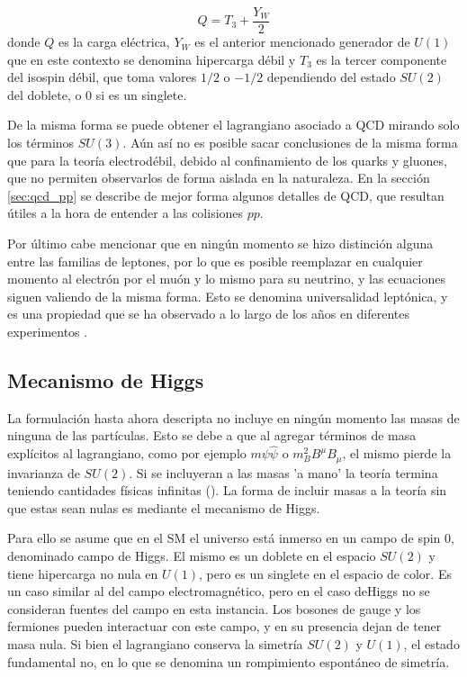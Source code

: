 \begin{equation}
Q = T_3 + \frac{Y_W}{2} 
\end{equation}
%
donde $Q$ es la carga eléctrica, $Y_W$ es el anterior mencionado generador de $U(1)$ que en este contexto se denomina hipercarga débil y $T_3$ es la tercer componente del isospin débil, que toma valores $1/2$ o $-1/2$ dependiendo del estado $SU(2)$ del doblete, o $0$ si es un singlete.

De la misma forma se puede obtener el lagrangiano asociado a QCD mirando solo los términos $SU(3)$. Aún así no es posible sacar conclusiones de la misma forma que para la teoría electrodébil, debido al confinamiento de los quarks y gluones, que no permiten observarlos de forma aislada en la naturaleza. En la sección \ref{sec:qcd_pp} se describe de mejor forma algunos detalles de QCD, que resultan útiles a la hora de entender a las colisiones $pp$.

Por último cabe mencionar que en ningún momento se hizo distinción alguna entre las familias de leptones, por lo que es posible reemplazar en cualquier momento al electrón por el muón y lo mismo para su neutrino, y las ecuaciones siguen valiendo de la misma forma. Esto se denomina universalidad leptónica, y es una propiedad que se ha observado a lo largo de los años en diferentes experimentos .


\subsection{Mecanismo de Higgs}

La formulación hasta ahora descripta no incluye en ningún momento las masas de ninguna de las partículas. Esto se debe a que al agregar términos de masa explícitos al lagrangiano, como por ejemplo $m\psi\hat{\psi}$ o $m_B^2 B^{\mu}B_{\mu}$, el mismo pierde la invarianza de $SU(2)$. Si se incluyeran a las masas 'a mano' la teoría termina teniendo cantidades físicas infinitas (). La forma de incluir masas a la teoría sin que estas sean nulas es mediante el mecanismo de Higgs. 

 Para ello se asume que en el SM el universo está inmerso en un campo de spin 0, denominado campo de Higgs. El mismo es un doblete en el espacio $SU(2)$ y tiene hipercarga no nula en $U(1)$, pero es un singlete en el espacio de color. Es un caso similar al del campo electromagnético, pero en el caso deHiggs no se consideran fuentes del campo en esta instancia. Los bosones de gauge y los fermiones pueden interactuar con este campo, y en su presencia dejan de tener masa nula. Si bien el lagrangiano conserva la simetría $SU(2)$ y $U(1)$, el estado fundamental no, en lo que se denomina un rompimiento espontáneo de simetría.

